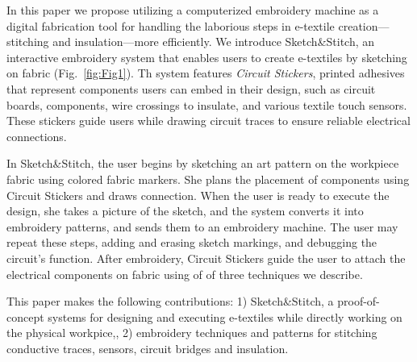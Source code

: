 \documentclass[header.tex]{subfiles}
\begin{document}
In this paper we propose utilizing a computerized embroidery machine as a digital fabrication tool for handling the laborious steps in e-textile creation---stitching and insulation---more efficiently. We introduce Sketch\&Stitch, an interactive embroidery system that enables users to create e-textiles by sketching on fabric (Fig.~\ref{fig:Fig1}). Th system features \textit{Circuit Stickers}, printed adhesives that represent components users can embed in their design, such as circuit boards, components, wire crossings to insulate, and various textile touch sensors. These stickers guide users while drawing circuit traces to ensure reliable electrical connections.

In Sketch\&Stitch, the user begins by sketching an art pattern on the workpiece fabric using colored fabric markers. She plans the placement of components using Circuit Stickers and draws connection. When the user is ready to execute the design, she takes a picture of the sketch, and the system converts it into embroidery patterns, and sends them to an embroidery machine. 
The user may repeat these steps, adding and erasing  sketch markings, and debugging the circuit's function.  After embroidery, Circuit Stickers guide the user to attach the electrical components on fabric using of of three techniques we describe.

This paper makes the following contributions: 1) Sketch\&Stitch, a proof-of-concept systems for designing and executing e-textiles while directly working on the physical workpice,, 2) embroidery techniques and patterns for stitching conductive traces, sensors, circuit bridges and insulation.












\end{document}
